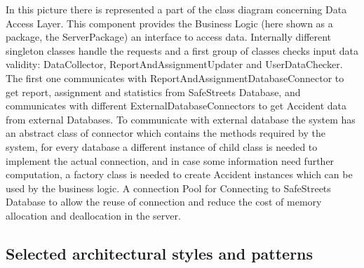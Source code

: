 In this picture there is represented a part of the class diagram concerning Data Access Layer. This component provides the Business Logic (here shown as a package, the ServerPackage) an interface to access data. Internally different singleton classes handle the requests and a first group of classes checks input data validity: DataCollector, ReportAndAssignmentUpdater and UserDataChecker. The first one communicates with ReportAndAssignmentDatabaseConnector to get report, assignment and statistics from SafeStreets Database, and communicates with different ExternalDatabaseConnectors to get Accident data from external Databases. To communicate with external database the system has an abstract class of connector which contains the methods required by the system, for every database a different instance of child class is needed to implement the actual connection, and in case some information need further computation, a factory class is needed to create Accident instances which can be used by the business logic. A connection Pool for Connecting to SafeStreets Database to allow the reuse of connection and reduce the cost of memory allocation and deallocation in the server.
\clearpage
\subsection{Selected architectural styles and patterns}
